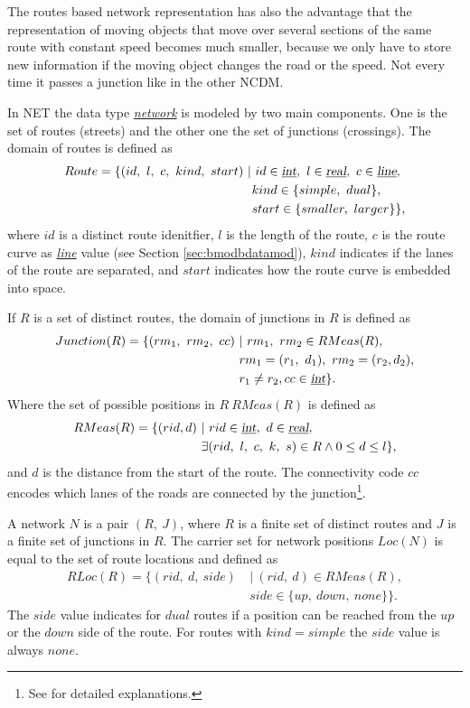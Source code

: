 \documentclass[a4paper]{article}
\newcommand{\dt}[1]{\textsl{\underline{#1}}}
\begin{document}
The routes based network representation has also the advantage that the
representation of moving objects that move over several sections of the same route
with constant speed becomes much smaller, because we only have to store new
information if the moving object changes the road or the speed. Not every time
it passes a junction like in the other NCDM.

In NET the data type \dt{network} is modeled by two main components. One is the
set  of routes (streets) and the other one the set of junctions (crossings). The
domain of routes is defined as
\[
\begin{split}
Route = \{(id,\ l,\ c,\ kind,\ start)\ &|\ id \in \dt{int},\ l \in \dt{real},
\ c \in \dt{line},\\
&\ kind \in \{simple,\ dual\},\\
&\ start \in \{smaller,\ larger\}\},
\end{split}
\]
where $id$ is a distinct route idenitfier, $l$ is the length of the route, $c$
is the route curve as \dt{line} value (see Section \ref{sec:bmodbdatamod}),
$kind$ indicates if the lanes of the route are separated, and $start$ indicates
how the route curve is embedded into space.

If $R$ is a set of distinct routes, the domain of junctions in $R$ is defined as
\[
  \begin{split}
    Junction(R)=\{(rm_1,\ rm_2,\ cc)\ &|\ rm_1,\ rm_2 \in RMeas(R),\\
&rm_1 = (r_1,\ d_1),\ rm_2 = (r_2, d_2),\\
&r_1 \neq r_2, cc \in \dt{int}\}.
  \end{split}
\]
Where the set of possible positions in $R\ RMeas(R)$ is defined as
\[
  \begin{split}
    RMeas(R) = \{(rid, d)\ &|\ rid \in \dt{int},\ d \in \dt{real},\\
&\exists (rid,\ l,\ c,\ k,\ s) \in R \wedge 0 \leq d \leq l\},
  \end{split}
\]
and $d$ is the distance from the start of the route.
The connectivity code $cc$ encodes which lanes of the roads are connected
by the junction\footnote{See \cite{NetworkGueting} for detailed explanations.}.

A network $N$ is a pair $(R,\ J)$, where $R$ is a finite set of distinct routes
and $J$ is a finite set of junctions in $R$. The carrier set for network
positions $Loc(N)$ is equal to the set of route locations and defined as
\[
  \begin{split}
    RLoc(R)=\{(rid,\ d,\ side)\ &|\ (rid,\ d) \in RMeas(R),\\
&side \in \{up,\ down,\ none\}\}.
  \end{split}
\]
The $side$ value indicates for $dual$ routes if a position can be reached
from the $up$ or the $down$ side of the route. For routes with $kind = simple$ the
$side$ value is always $none$.
\end{document}
